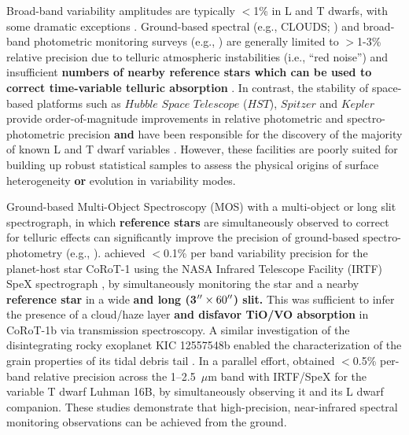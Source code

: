 \documentclass[twocolumn]{aastex6}
\begin{document}
Broad-band variability amplitudes are typically $<$1\% in L and T dwarfs, with some dramatic exceptions \citep{2009ApJ...701.1534A,2012ApJ...750..105R,2013A&A...555L...5G,2016ApJ...829L..32L}. 
Ground-based spectral (e.g., CLOUDS; \citealt{2008A&A...487..277G}) and broad-band photometric monitoring surveys (e.g., \citealt{1999A&A...348..800B,2003MNRAS.346..473K,2014ApJ...793...75R,2014A&A...566A.111W}) are generally limited to $>$1-3\% relative precision due to telluric atmospheric instabilities (i.e., ``red noise'') and insufficient \textbf{numbers of nearby reference stars which can be used to correct time-variable telluric absorption} \citep{2003MNRAS.339..477B}.
In contrast, the stability of space-based platforms such as $Hubble$ $Space$ $Telescope$ ($HST$), $Spitzer$ and $Kepler$ provide order-of-magnitude improvements in relative photometric and spectro-photometric precision \textbf{and} have been responsible for the discovery of the majority of known L and T dwarf variables \citep{2013ApJ...768..121A,2013ApJ...779..172G,2015ApJ...799..154M}. However, these facilities are poorly suited for building up robust statistical samples to assess the physical origins of surface heterogeneity \textbf{or} evolution in variability modes. 

Ground-based Multi-Object Spectroscopy (MOS) with a multi-object or long slit spectrograph, in which \textbf{reference stars} are simultaneously observed to correct for telluric effects can significantly improve the precision of ground-based spectro-photometry (e.g., \citealt{bean10,bean2013,gibson13clouds,stevenson2016hatp26}). \citet{2014ApJ...783....5S} achieved $<$0.1\% per band variability precision for the planet-host star CoRoT-1 using the NASA Infrared Telescope Facility (IRTF) SpeX spectrograph \citep{2003PASP..115..362R}, by simultaneously monitoring the star and a nearby \textbf{reference star} in a wide \textbf{and long (3$\mbox{$^{\prime\prime}$} \times 60 \mbox{$^{\prime\prime}$}$) slit.}
This was sufficient to infer the presence of a cloud/haze layer \textbf{and disfavor TiO/VO absorption} in CoRoT-1b via transmission spectroscopy. A similar investigation of the disintegrating rocky exoplanet KIC 12557548b  enabled the characterization of the grain properties of its tidal debris tail \citep{2016ApJ...826..156S}. In a parallel effort, \citet{2014ApJ...785...48B} obtained $<$0.5\% per-band relative precision across the 1--2.5~$\mu$m band with IRTF/SpeX for the variable T dwarf Luhman 16B, by simultaneously observing it and its L dwarf companion. These studies demonstrate that high-precision, near-infrared spectral monitoring observations can be achieved from the ground.
\end{document}
